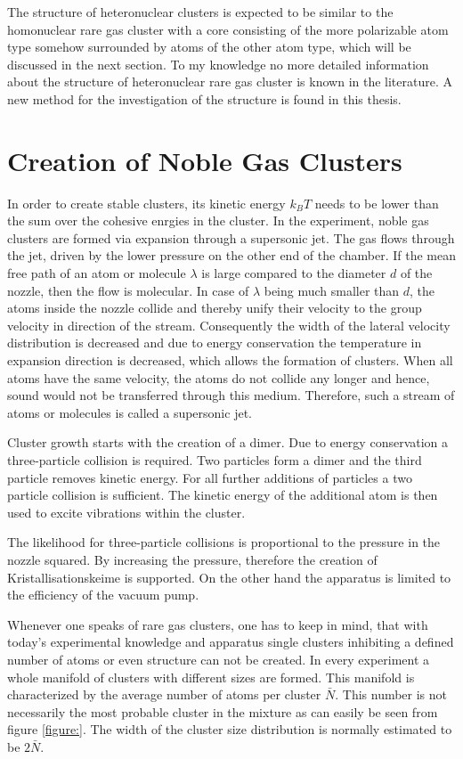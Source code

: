The structure of heteronuclear clusters is expected to be similar to the
homonuclear rare gas cluster with a core consisting of the more polarizable
atom type somehow surrounded by atoms of the other atom type, which will be discussed
in the next section. To my knowledge no more detailed information about
the structure of heteronuclear rare gas cluster is known in the
literature. A new method for the investigation of the structure is found
in this thesis.


\section{Creation of Noble Gas Clusters}
In order to create stable clusters, its kinetic energy $k_BT$ needs to be lower
than the sum over the cohesive enrgies in the cluster.
In the experiment, noble gas clusters are formed via expansion through
a supersonic jet. The gas flows through the jet, driven by the lower pressure
on the other end of the chamber. If the mean free path of an atom or molecule
$\lambda$ is large compared to the diameter $d$ of the nozzle, then the flow is
molecular. In case of $\lambda$ being much smaller than $d$, the atoms inside
the nozzle collide and thereby unify their velocity to the group velocity
in direction of the stream. Consequently the width of the lateral velocity
distribution is decreased and due to energy conservation the temperature
in expansion direction is decreased, which allows the formation of clusters.
When all atoms have the same velocity, the atoms do not collide any longer
and hence, sound would not be transferred through this medium. Therefore,
such a stream of atoms or molecules is called a supersonic jet.

Cluster growth starts with the creation of a dimer. Due to energy conservation
a three-particle collision is required. Two particles form a dimer and the
third particle removes kinetic energy. For all further additions of particles
a two particle collision is sufficient. The kinetic energy of the additional
atom is then used to excite vibrations within the cluster.

The likelihood for three-particle collisions is proportional to the pressure
in the nozzle squared. By increasing the pressure, therefore the creation
of Kristallisationskeime is supported. On the other hand the apparatus
is limited to the efficiency of the vacuum pump.

Whenever one speaks of rare gas clusters, one has to keep in mind, that
with today's experimental knowledge and apparatus single clusters
inhibiting a defined number of atoms or even structure can not be created.
In every experiment a whole manifold of clusters with different sizes are
formed. This manifold is characterized by the average number of atoms
per cluster $\bar{N}$. This number is not necessarily the most probable
cluster in the mixture as can easily be seen from figure \ref{figure:}.
The width of the cluster size distribution is normally estimated to be
$2\bar{N}$.

